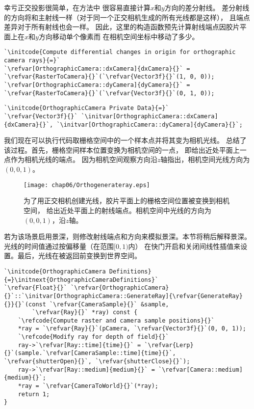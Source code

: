 幸亏正交投影很简单，在方法中
很容易直接计算$x$和$y$方向的差分射线。
差分射线的方向将和主射线一样（对于同一个正交相机生成的所有光线都是这样），
且端点差异对于所有射线也会一样。
因此，这里的构造函数预先计算射线端点因胶片平面上在$x$和$y$方向移动单个像素而
在相机空间坐标中移动了多少。
\begin{lstlisting}
`\initcode{Compute differential changes in origin for orthographic camera rays}{=}`
`\refvar[OrthographicCamera::dxCamera]{dxCamera}{}` = `\refvar{RasterToCamera}{}`(`\refvar{Vector3f}{}`(1, 0, 0));
`\refvar[OrthographicCamera::dyCamera]{dyCamera}{}` = `\refvar{RasterToCamera}{}`(`\refvar{Vector3f}{}`(0, 1, 0));
\end{lstlisting}
\begin{lstlisting}
`\initcode{OrthographicCamera Private Data}{=}`
`\refvar{Vector3f}{}` `\initvar[OrthographicCamera::dxCamera]{dxCamera}{}`, `\initvar[OrthographicCamera::dyCamera]{dyCamera}{}`;
\end{lstlisting}

我们现在可以执行代码取栅格空间中的一个样本点并将其变为相机光线。
总结了该过程。首先，栅格空间样本位置变换为相机空间的一点，
即给出近处平面上一点作为相机光线的端点。
因为相机空间观察方向沿$z$轴指出，相机空间光线方向为$(0,0,1)$。

\begin{figure}[htbp]
    \centering\texttt{[image: chap06/Orthogenerateray.eps]}
    \caption{为了用正交相机创建光线，胶片平面上的栅格空间位置被变换到相机空间，
        给出近处平面上的射线端点。相机空间中光线的方向为$(0,0,1)$，沿$z$轴。}
    \label{fig:6.4}
\end{figure}

若为该场景启用景深，则修改射线端点和方向来模拟景深。本节将稍后解释景深。
光线的时间值通过按偏移量（在范围$[0,1)$内）
在快门开启和关闭间线性插值来设置。最后，光线在被返回前变换到世界空间。
\begin{lstlisting}
`\initcode{OrthographicCamera Definitions}{=}\initnext{OrthographicCameraDefinitions}`
`\refvar{Float}{}` `\refvar{OrthographicCamera}{}`::`\initvar[OrthographicCamera::GenerateRay]{\refvar{GenerateRay}{}}{}`(const `\refvar{CameraSample}{}` &sample,
        `\refvar{Ray}{}` *ray) const {
    `\refcode{Compute raster and camera sample positions}{}`
    *ray = `\refvar{Ray}{}`(pCamera, `\refvar{Vector3f}{}`(0, 0, 1));
    `\refcode{Modify ray for depth of field}{}`
    ray->`\refvar[Ray::time]{time}{}` = `\refvar{Lerp}{}`(sample.`\refvar[CameraSample::time]{time}{}`, `\refvar{shutterOpen}{}`, `\refvar{shutterClose}{}`);
    ray->`\refvar[Ray::medium]{medium}{}` = `\refvar[Camera::medium]{medium}{}`;
    *ray = `\refvar{CameraToWorld}{}`(*ray);
    return 1;
}
\end{lstlisting}

